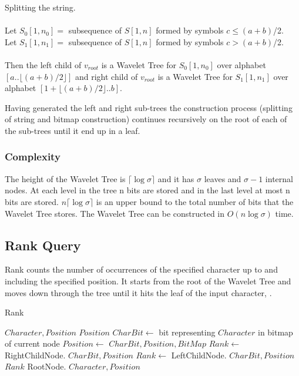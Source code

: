 \vspace{0.5 cm}
\begin{mdframed}[nobreak, linecolor=lightgray]
\begin{definition} Splitting the string. \\\\
Let $S_0[1,n_0] =$ subsequence of $S[1,n]$ formed by symbols $c \leq (a + b)$/2.\\
Let $S_1[1,n_1] =$ subsequence of $S[1,n]$ formed by symbols $c > (a + b)$/2.\\\\
Then the left child of $v_{root}$ is a Wavelet Tree for $S_0[1,n_0]$ over alphabet $[a .. \lfloor (a + b)/2 \rfloor]$ and right child of $v_{root}$ is a Wavelet Tree for $S_1[1,n_1]$ over alphabet $[1 + \lfloor (a + b)/2 \rfloor .. b]$. 
\end{definition}
\end{mdframed}
\vspace{0.5 cm}

Having generated the left and right sub-trees the construction process (splitting of string and bitmap construction) continues recursively on the root of each of the sub-trees until it end up in a leaf.

\subsubsection{Complexity}
The height of the Wavelet Tree is  $\lceil \log \sigma \rceil$ and it has $\sigma$ leaves and $\sigma - 1$ internal nodes. 
At each level in the tree n bits are stored and in the last level at most n bits are stored. $n \lceil \log \sigma \rceil$ is an upper bound to the total number of bits that the Wavelet Tree stores. 
The Wavelet Tree can be constructed in $O(n \log \sigma)$ time.

\subsection{Rank Query}
Rank counts the number of occurrences of the specified character up to and including the specified position. 
It starts from the root of the Wavelet Tree and moves down through the tree until it hits the leaf of the input character, \citep[Section 2.2]{Claude08practicalrankselect}.

\begin{algorithm}
\caption{Rank}
\label{alg:rank}
\begin{algorithmic} 
 {$Character, Position$}
\State \Return $Position$
\EndIf
\State $CharBit \gets$ bit representing $Character$ in bitmap of current node
\State $Position \gets$  {$CharBit, Position, BitMap$}
	\State $Rank \gets$ RightChildNode. {$CharBit, Position$}
\Else
	\State $Rank \gets$ LeftChildNode. {$CharBit, Position$}
\EndIf
\State \Return $Rank$ 
\EndFunction
\State RootNode. {$Character, Position$}
\end{algorithmic}
\end{algorithm}




